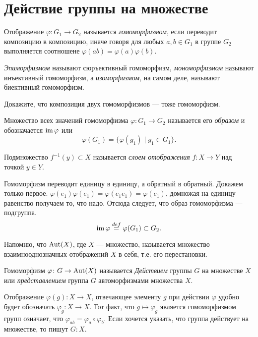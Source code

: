 \section{Действие группы на множестве}
\begin{definition}
    Отображение $\varphi\colon G_1 \to G_2$ называется \emph{гомоморфизмом}, если переводит композицию в композицию, иначе говоря для любых $a,b \in G_1$ в группе $G_2$ выполняется соотношене \(\varphi(ab) = \varphi(a)\varphi(b)\).

    \emph{Эпиморфизмом} называют сюръективный гомоморфизм, \emph{мономорфизмом} называют инъективный гомоморфизм, а \emph{изоморфизмом}, на самом деле, называют биективный гомоморфизм.
\end{definition}

\begin{practice}
    Докажите, что композиция двух гомоморфизмов --- тоже гомоморфизм.
\end{practice}

\begin{definition}
    Множество всех значений гомоморфизма $\varphi \colon G_1 \to G_2$ называется его \emph{образом} и обозначается $\operatorname{im} \varphi$ или $$\varphi (G_1) = \{\varphi(g_1)\mid g_1 \in G_1\}.$$
\end{definition}

\begin{definition}
    Подмножество $f^{-1}(y) \subset X$ называется \emph{слоем отображения} $f \colon X \to Y$ над точкой $y \in Y$.
\end{definition}

Гомоморфизм переводит единицу в единицу, а обратный в обратный. Докажем только первое. \(\varphi(e_1)\varphi(e_1) = \varphi(e_1e_1)=\varphi(e_1)\), домножая на единицу равенство получаем то, что надо. Отсюда следует, что образ гомоморфизма --- подгруппа. \[\operatorname{im} \varphi \overset{def}{=} \varphi(G_1) \subset G_2.\]

Напомню, что $\operatorname{Aut}(X)$, где $X$ --- множество, называется множество взаимнооднозначных отображений $X$ в себя, т.е. его перестановки.

\begin{definition}
Гомоморфизм $\varphi\colon G \to \operatorname{Aut}(X)$ называется \emph{Действием} группы $G$ на множестве $X$ или \emph{представлением} группа $G$ автоморфизмами множества $X$. 

Отображение $\varphi(g) \colon X \to X$, отвечающее элементу $g$ при действии $\varphi$ удобно будет обозначать $\varphi_g \colon X \to X$. Тот факт, что $g \mapsto \varphi_g$ является гомоморфизмом групп означает, что $\varphi_{ab} = \varphi_a \circ \varphi_b$. Если хочется указать, что группа действует на множестве, то пишут $G \colon X$.
\end{definition}


